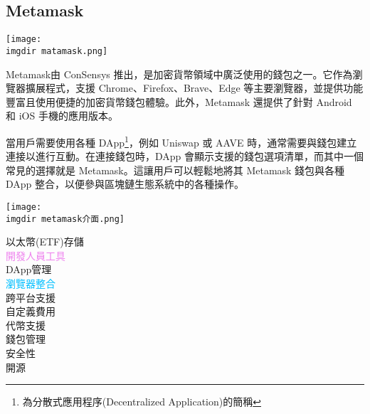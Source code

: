 \documentclass[12pt, a4paper]{article}
\begin{document}
\subsection{\R Metamask}
\begin{minipage}{.4\linewidth}
        \texttt{[image: \\imgdir matamask.png]}
        \label{matamask}
\end{minipage}
\begin{minipage}{.6\linewidth}
Metamask由 ConSensys 推出，是加密貨幣領域中廣泛使用的錢包之一。它作為瀏覽器擴展程式，支援 Chrome、Firefox、Brave、Edge 等主要瀏覽器，並提供功能豐富且使用便捷的加密貨幣錢包體驗。此外，Metamask 還提供了針對 Android 和 iOS 手機的應用版本。
\end{minipage}
\begin{minipage}{.6\linewidth}
當用戶需要使用各種 DApp\footnote{為分散式應用程序(Decentralized Application)的簡稱}，例如 Uniswap 或 AAVE 時，通常需要與錢包建立連接以進行互動。在連接錢包時，DApp 會顯示支援的錢包選項清單，而其中一個常見的選擇就是 Metamask。這讓用戶可以輕鬆地將其 Metamask 錢包與各種 DApp 整合，以便參與區塊鏈生態系統中的各種操作。
\end{minipage}
\begin{minipage}{.4\linewidth}
        \texttt{[image: \\imgdir metamask介面.png]}
        \label{metamask介面}
\end{minipage}
\begin{center}
\textcolor {usccardinal}{\Huge {以太幣(ETF)存儲}}\\
\textcolor {violet}{\huge{開發人員工具}}\\
\textcolor {navyblue}{\LARGE{DApp管理}}\\
\textcolor {deepskyblue}{\Large{瀏覽器整合}}\\
\textcolor {lime(web)(x11green)}{\large{跨平台支援}}\\
\textcolor {fluorescentyellow}{\normalsize{自定義費用}}\\
\textcolor {citrine}{\small{代幣支援}}\\
\textcolor {amber(sae/ece)}{\footnotesize{錢包管理}}\\
\textcolor {ruddy}{\scriptsize{安全性}}\\
\textcolor {razzledazzlerose}{\tiny{開源}}\\
\normalsize
\end{center}
\end{document}
